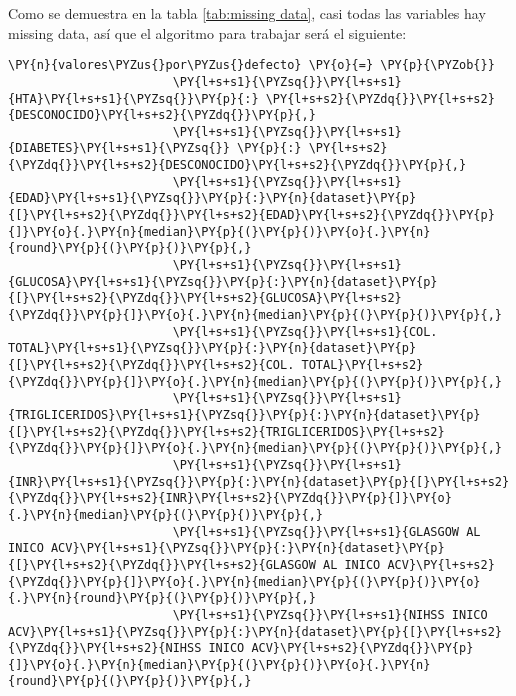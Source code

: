     Como se demuestra en la tabla \ref{tab:missing data}, casi todas las variables hay missing data, así que el algoritmo para trabajar será el siguiente:

    \begin{tcolorbox}[breakable, size=fbox, boxrule=1pt, pad at break*=1mm,colback=cellbackground, colframe=cellborder]
\begin{Verbatim}[commandchars=\\\{\}]
\PY{n}{valores\PYZus{}por\PYZus{}defecto} \PY{o}{=} \PY{p}{\PYZob{}}
                       \PY{l+s+s1}{\PYZsq{}}\PY{l+s+s1}{HTA}\PY{l+s+s1}{\PYZsq{}}\PY{p}{:} \PY{l+s+s2}{\PYZdq{}}\PY{l+s+s2}{DESCONOCIDO}\PY{l+s+s2}{\PYZdq{}}\PY{p}{,}
                       \PY{l+s+s1}{\PYZsq{}}\PY{l+s+s1}{DIABETES}\PY{l+s+s1}{\PYZsq{}} \PY{p}{:} \PY{l+s+s2}{\PYZdq{}}\PY{l+s+s2}{DESCONOCIDO}\PY{l+s+s2}{\PYZdq{}}\PY{p}{,}
                       \PY{l+s+s1}{\PYZsq{}}\PY{l+s+s1}{EDAD}\PY{l+s+s1}{\PYZsq{}}\PY{p}{:}\PY{n}{dataset}\PY{p}{[}\PY{l+s+s2}{\PYZdq{}}\PY{l+s+s2}{EDAD}\PY{l+s+s2}{\PYZdq{}}\PY{p}{]}\PY{o}{.}\PY{n}{median}\PY{p}{(}\PY{p}{)}\PY{o}{.}\PY{n}{round}\PY{p}{(}\PY{p}{)}\PY{p}{,}
                       \PY{l+s+s1}{\PYZsq{}}\PY{l+s+s1}{GLUCOSA}\PY{l+s+s1}{\PYZsq{}}\PY{p}{:}\PY{n}{dataset}\PY{p}{[}\PY{l+s+s2}{\PYZdq{}}\PY{l+s+s2}{GLUCOSA}\PY{l+s+s2}{\PYZdq{}}\PY{p}{]}\PY{o}{.}\PY{n}{median}\PY{p}{(}\PY{p}{)}\PY{p}{,}
                       \PY{l+s+s1}{\PYZsq{}}\PY{l+s+s1}{COL. TOTAL}\PY{l+s+s1}{\PYZsq{}}\PY{p}{:}\PY{n}{dataset}\PY{p}{[}\PY{l+s+s2}{\PYZdq{}}\PY{l+s+s2}{COL. TOTAL}\PY{l+s+s2}{\PYZdq{}}\PY{p}{]}\PY{o}{.}\PY{n}{median}\PY{p}{(}\PY{p}{)}\PY{p}{,} 
                       \PY{l+s+s1}{\PYZsq{}}\PY{l+s+s1}{TRIGLICERIDOS}\PY{l+s+s1}{\PYZsq{}}\PY{p}{:}\PY{n}{dataset}\PY{p}{[}\PY{l+s+s2}{\PYZdq{}}\PY{l+s+s2}{TRIGLICERIDOS}\PY{l+s+s2}{\PYZdq{}}\PY{p}{]}\PY{o}{.}\PY{n}{median}\PY{p}{(}\PY{p}{)}\PY{p}{,}
                       \PY{l+s+s1}{\PYZsq{}}\PY{l+s+s1}{INR}\PY{l+s+s1}{\PYZsq{}}\PY{p}{:}\PY{n}{dataset}\PY{p}{[}\PY{l+s+s2}{\PYZdq{}}\PY{l+s+s2}{INR}\PY{l+s+s2}{\PYZdq{}}\PY{p}{]}\PY{o}{.}\PY{n}{median}\PY{p}{(}\PY{p}{)}\PY{p}{,}
                       \PY{l+s+s1}{\PYZsq{}}\PY{l+s+s1}{GLASGOW AL INICO ACV}\PY{l+s+s1}{\PYZsq{}}\PY{p}{:}\PY{n}{dataset}\PY{p}{[}\PY{l+s+s2}{\PYZdq{}}\PY{l+s+s2}{GLASGOW AL INICO ACV}\PY{l+s+s2}{\PYZdq{}}\PY{p}{]}\PY{o}{.}\PY{n}{median}\PY{p}{(}\PY{p}{)}\PY{o}{.}\PY{n}{round}\PY{p}{(}\PY{p}{)}\PY{p}{,}
                       \PY{l+s+s1}{\PYZsq{}}\PY{l+s+s1}{NIHSS INICO ACV}\PY{l+s+s1}{\PYZsq{}}\PY{p}{:}\PY{n}{dataset}\PY{p}{[}\PY{l+s+s2}{\PYZdq{}}\PY{l+s+s2}{NIHSS INICO ACV}\PY{l+s+s2}{\PYZdq{}}\PY{p}{]}\PY{o}{.}\PY{n}{median}\PY{p}{(}\PY{p}{)}\PY{o}{.}\PY{n}{round}\PY{p}{(}\PY{p}{)}\PY{p}{,} 

\end{Verbatim}
\end{tcolorbox}
